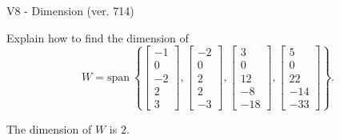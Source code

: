 \begin{exercise}
  \begin{exerciseTitle}V8 - Dimension (ver. 714)\end{exerciseTitle}
  \begin{exerciseStatement}
    Explain how to find the dimension of 
\[W=\mathrm{span}\ \left\{\left[\begin{array}{r}
-1 \\
0 \\
-2 \\
2 \\
3
\end{array}\right] , \left[\begin{array}{r}
-2 \\
0 \\
2 \\
2 \\
-3
\end{array}\right] , \left[\begin{array}{r}
3 \\
0 \\
12 \\
-8 \\
-18
\end{array}\right] , \left[\begin{array}{r}
5 \\
0 \\
22 \\
-14 \\
-33
\end{array}\right]\right\}.\]



  \end{exerciseStatement}
  \begin{exerciseAnswer}
   The dimension of \(W\) is  \(2\).
  


  \end{exerciseAnswer}
\end{exercise}